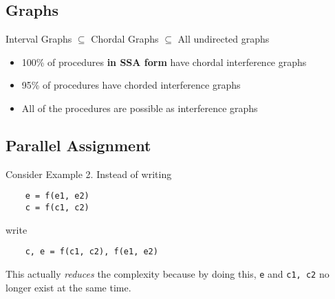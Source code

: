\documentclass[10pt]{article}
\begin{document}
\subsection*{Graphs}

\begin{center}
    Interval Graphs $\subseteq$ Chordal Graphs $\subseteq$ All undirected graphs
\end{center}
\begin{itemize}
    \item 100\% of procedures \textbf{in SSA form} have chordal interference graphs
    \item 95\% of procedures have chorded interference graphs
    \item All of the procedures are possible as interference graphs
\end{itemize}

\pagebreak
\subsection*{Parallel Assignment}
Consider Example 2.
Instead of writing
\begin{verbatim}
    e = f(e1, e2)
    c = f(c1, c2)
\end{verbatim}
write
\begin{verbatim}
    c, e = f(c1, c2), f(e1, e2)
\end{verbatim}
This actually \textit{reduces} the complexity because by doing this, \texttt{e} and \texttt{c1, c2} no longer exist at the same time.
\end{document}
